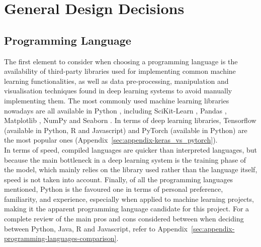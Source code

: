 
\section{General Design Decisions}

\subsection{Programming Language}


The first element to consider when choosing a programming language is the availability of third-party libraries used for implementing common machine learning functionalities, as well as data pre-processing, manipulation and visualisation techniques found in deep learning systems to avoid manually implementing them. The most commonly used machine learning libraries nowadays are all available in Python \citep{raschka2017python}, including SciKit-Learn \citep{scikit-learn}, Pandas \citep{reback2020pandas}, Matplotlib \citep{Hunter:2007}, NumPy \citep{numpy} and Seaborn \citep{seaborn}. In terms of deep learning libraries, Tensorflow (available in Python, R and Javascript) and PyTorch (available in Python) are  the most popular ones (Appendix~\ref{sec:appendix-keras_vs_pytorch}).\\

In terms of speed, compiled languages are quicker than interpreted languages, but because the main bottleneck in a deep learning system is the training phase of the model, which mainly relies on the library used rather than the language itself, speed is not taken into account. Finally, of all the programming languages mentioned, Python is the favoured one in terms of personal preference, familiarity, and experience, especially when applied to machine learning projects, making it the apparent programming language candidate for this project. For a complete review of the main pros and cons considered between when deciding between Python, Java, R and Javascript, refer to Appendix~\ref{sec:appendix-programming-languages-comparison}.

